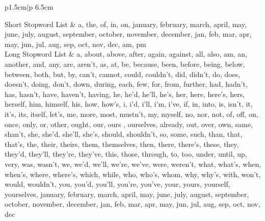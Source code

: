 \documentclass{sig-alternate}
\begin{document}
\begin{table}[h!t!]
\begin{center}
\begin{tabular}{p{1.5cm}|p {6.5cm}}

\hline

\hline
Short Stopword List & a, the, of, in, on, january, february, march, april, may, june, july, august, september, october, november, december, jan, feb, mar, apr, may, jun, jul, aug, sep, oct, nov, dec, am, pm \\
\hline
Long Stopword List & a, about, above, after, again, against, all, also, am, an, another, and, any, are, aren't, as, at, be, because, been, before, being, below, between, both, but, by, can't, cannot, could, couldn't, did, didn't, do, does, doesn't, doing, don't, down, during, each, few, for, from, further, had, hadn't, has, hasn't, have, haven't, having, he, he'd, he'll, he's, her, here, here's, hers, herself, him, himself, his, how, how's, i, i'd, i'll, i'm, i've, if, in, into, is, isn't, it, it's, its, itself, let's, me, more, most, mustn't, my, myself, no, nor, not, of, off, on, once, only, or, other, ought, our, ours , ourselves, already, out, over, own, same, shan't, she, she'd, she'll, she's, should, shouldn't, so, some, such, than, that, that's, the, their, theirs, them, themselves, then, there, there's, these, they, they'd, they'll, they're, they've, this, those, through, to, too, under, until, up, very, was, wasn't, we, we'd, we'll, we're, we've, were, weren't, what, what's, when, when's, where, where's, which, while, who, who's, whom, why, why's, with, won't, would, wouldn't, you, you'd, you'll, you're, you've, your, yours, yourself, yourselves, january, february, march, april, may, june, july, august, september, october, november, december, jan, feb, mar, apr, may, jun, jul, aug, sep, oct, nov, dec\\

\hline
\end{tabular}
\caption{Stop word list for blogs.}
\label{table:stopwords}
\end{center}
\end{table}
\end{document}
